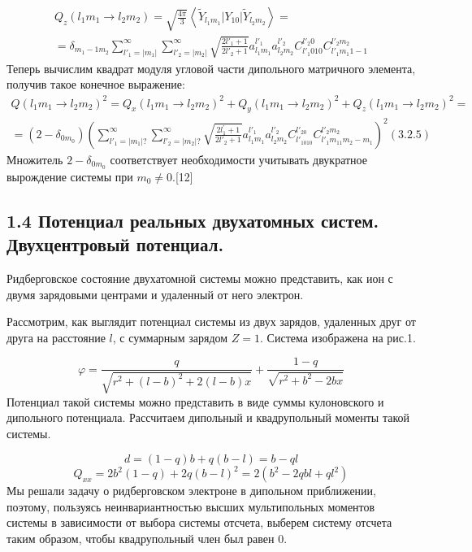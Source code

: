 \begin{multline*}
Q_z\left(l_1m_1\rightarrow l_2m_2\right)=\sqrt{\frac{4\pi } 3} \left< \widetilde Y_{l_1m_1}|Y_{10}|\widetilde Y_{l_2m_2} \right> =
\\
= \delta_{m_1-1 m_2}\sum_{l'_1=|m_1|}^{\infty} \sum_{l'_2=|m_2|}^{\infty}\sqrt{\frac{2l'_1+1}{2l'_2+1}}a_{l_1 m_1}^{l'_1 } a_{l_2 m_2}^{l'_2} C_{l'_1 010}^{l'_2 0} C_{l'_1 m_1 1-1}^{l'_2 m_2 }
\end{multline*}
Теперь вычислим квадрат модуля угловой части дипольного матричного элемента, получив такое конечное выражение:
\begin{multline*}
	Q\left(l_1m_1\rightarrow l_2m_2\right)^2=
Q_x\left(l_1m_1\rightarrow l_2m_2\right)^2+Q_y\left(l_1m_1\rightarrow l_2m_2\right)^2+Q_z\left(l_1m_1\rightarrow l_2m_2\right)^2 =
\\
= \left(2-\delta _{0m_0}\right)\left(\sum _{l'_1=| m_1|
	?}^{{\infty}}\sum _{l'_2=| m_2|
	?}^{\infty} \sqrt{\frac{2l^{'}_1+1}{2l{'}_2+1}}a_{l_1m_1}^{l{'}_1}a_{l_2m_2}^{l{'}_2}C_{l{'}_1010}^{l{'}_20}C_{l{'}_1 m_11 m_2-m_1}^{l{'}_2m_2}\right)^2(3.2.5)
\end{multline*}
Множитель  $2-\delta _{0m_0}$ соответствует необходимости учитывать двукратное вырождение системы при  $m_0{\neq}0$.{[12]}

\subsection{1.4 Потенциал
реальных двухатомных систем. Двухцентровый
потенциал.}
{\par}
Ридберговское состояние двухатомной системы можно представить, как ион с двумя зарядовыми центрами и удаленный от него электрон.

Рассмотрим, как выглядит потенциал системы из двух зарядов, удаленных друг от друга на
расстояние $l$, с суммарным зарядом $Z=1$. Система
изображена на рис.1.

\begin{equation*}
\varphi =\frac q{\sqrt{r^2+(l-b)^2+2(l-b)x}}+\frac{1-q}{\sqrt{r^2+b^2-2\mathit{bx}}}
\end{equation*}
Потенциал такой системы можно представить в виде суммы кулоновского и дипольного потенциала. Рассчитаем дипольный и квадрупольный моменты такой системы.

\begin{equation*}
d=\left(1-q\right)b+q\left(b-l\right)=b-\mathit{ql}
\end{equation*}
\begin{equation*}
Q_{\mathit{xx}}=2b^2\left(1-q\right)+2q\left(b-l\right)^2=2\left(b^2-2q\mathit{bl}+ql^2\right)
\end{equation*}
Мы решали задачу о ридберговском электроне в дипольном приближении, поэтому, пользуясь неинвариантностью высших мультипольных моментов системы в зависимости от выбора системы отсчета, выберем систему отсчета таким образом, чтобы квадрупольный член был равен 0.


